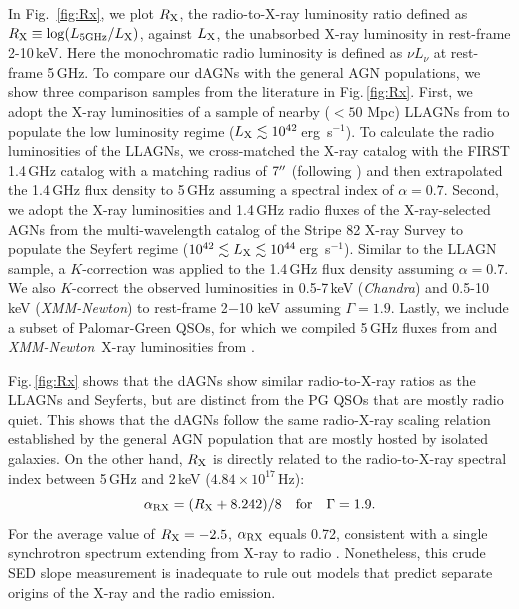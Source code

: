 \documentclass[iop,revtex4,twocolumn,apj,numberedappendix,appendixfloats]{emulateapj}
\newcommand{\ergs}{erg~s$^{-1}$}
\newcommand{\chandra}{{\it Chandra}}
\newcommand{\xmm}{{\it XMM-Newton}}
\begin{document}
In Fig.~\ref{fig:Rx}, we plot $R_{\rm X}$, the radio-to-X-ray luminosity ratio defined as $R_{\rm X} \equiv \log(L_{\rm 5GHz}/L_{\rm X})$, against $L_{\rm X}$, the unabsorbed X-ray luminosity in rest-frame 2-10\,keV. Here the monochromatic radio luminosity is defined as $\nu L_\nu$ at rest-frame 5\,GHz.
%
To compare our dAGNs with the general AGN populations, we show three comparison samples from the literature in Fig.\,\ref{fig:Rx}.
%  
First, we adopt the X-ray luminosities of a sample of nearby ($< 50$ Mpc) LLAGNs from \citet{She17} to populate the low luminosity regime ($L_{\rm X} \lesssim 10^{42}$\,\ergs). To calculate the radio luminosities of the LLAGNs, we cross-matched the X-ray catalog with the FIRST 1.4\,GHz catalog \citep{Helfand15} with a matching radius of $7\mbox{$^{\prime\prime}$}$ (following \citet{Lamassa16}) and then extrapolated the 1.4\,GHz flux density to 5\,GHz assuming a spectral index of $\alpha = 0.7$. 
%
Second, we adopt the X-ray luminosities and 1.4\,GHz radio fluxes of the X-ray-selected AGNs from the multi-wavelength catalog of the Stripe 82 X-ray Survey \citep{Lamassa16} to populate the Seyfert regime ($10^{42} \lesssim L_{\rm X} \lesssim 10^{44}$\,\ergs). Similar to the LLAGN sample, a $K$-correction was applied to the 1.4\,GHz flux density assuming $\alpha = 0.7$. We also $K$-correct the observed luminosities in 0.5-7\,keV (\chandra) and 0.5-10\,keV (\xmm) to rest-frame 2$-$10 keV assuming $\Gamma = 1.9$.
%
Lastly, we include a subset of Palomar-Green QSOs, for which we compiled 5\,GHz fluxes from \citet{Kellermann89} and \xmm\ X-ray luminosities from \citet{Piconcelli05}. 

Fig.\,\ref{fig:Rx} shows that the dAGNs show similar radio-to-X-ray ratios as the LLAGNs and Seyferts, but are distinct from the PG QSOs that are mostly radio quiet. This shows that the dAGNs follow the same radio-X-ray scaling relation established by the general AGN population that are mostly hosted by isolated galaxies. On the other hand, $R_{\rm X}$ is directly related to the radio-to-X-ray spectral index between 5\,GHz and 2\,keV ($4.84\times10^{17}$\,Hz):
\begin{equation}
 \alpha_{\rm RX} = (R_{\rm X}+8.242)/8 ~~~{\rm for}~~~ \Gamma = 1.9.
\end{equation}
For the average value of $R_{\rm X} = -2.5$, $\alpha_{\rm RX}$ equals 0.72, consistent with a single synchrotron spectrum extending from X-ray to radio \citep[e.g.,][]{Hardcastle01}. Nonetheless, this crude SED slope measurement is inadequate to rule out models that predict separate origins of the X-ray and the radio emission. 
\end{document}
